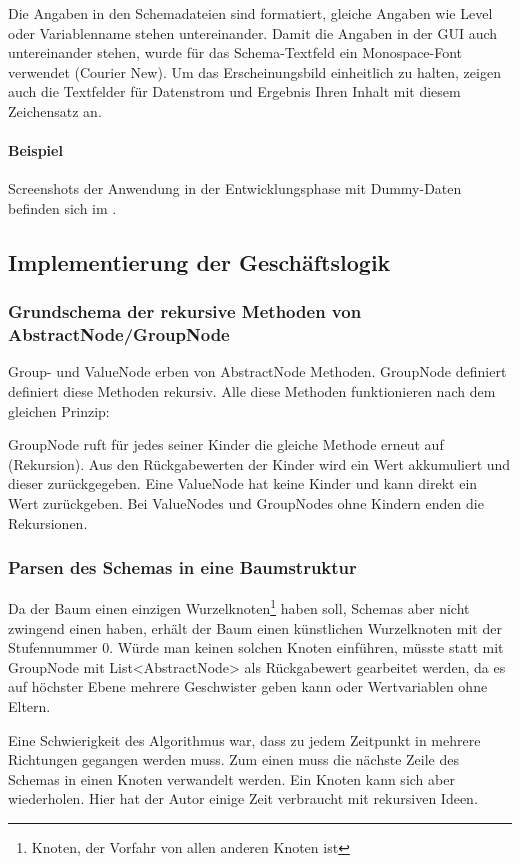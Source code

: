 Die Angaben in den Schemadateien sind formatiert, gleiche Angaben wie Level oder Variablenname stehen untereinander. Damit die Angaben in der GUI auch untereinander stehen, wurde für das Schema-Textfeld ein Monospace-Font verwendet (Courier New). Um das Erscheinungsbild einheitlich zu halten, zeigen auch die Textfelder für Datenstrom und Ergebnis Ihren Inhalt mit diesem Zeichensatz an.
\paragraph{Beispiel}
Screenshots der Anwendung in der Entwicklungsphase mit Dummy-Daten befinden sich im .


\subsection{Implementierung der Geschäftslogik}
\label{sec:ImplementierungGeschaeftslogik}

\subsubsection{Grundschema der rekursive Methoden von AbstractNode/GroupNode}
Group- und ValueNode erben von AbstractNode Methoden. GroupNode definiert definiert diese Methoden rekursiv. Alle diese Methoden funktionieren nach dem gleichen Prinzip:

GroupNode ruft für jedes seiner Kinder die gleiche Methode erneut auf (Rekursion). Aus den Rückgabewerten der Kinder wird ein Wert akkumuliert und dieser zurückgegeben.
Eine ValueNode hat keine Kinder und kann direkt ein Wert zurückgeben. Bei ValueNodes und GroupNodes ohne Kindern enden die Rekursionen.



\subsubsection{Parsen des Schemas in eine Baumstruktur}
Da der Baum einen einzigen Wurzelknoten\footnote{Knoten, der Vorfahr von allen anderen Knoten ist} haben soll, Schemas aber nicht zwingend einen haben, erhält der Baum einen künstlichen Wurzelknoten mit der Stufennummer 0. Würde man keinen solchen Knoten einführen, müsste statt mit GroupNode mit List<AbstractNode> als Rückgabewert gearbeitet werden, da es auf höchster Ebene mehrere Geschwister geben kann oder Wertvariablen ohne Eltern.

Eine Schwierigkeit des Algorithmus war, dass zu jedem Zeitpunkt in mehrere Richtungen gegangen werden muss. Zum einen muss die nächste Zeile des Schemas in einen Knoten verwandelt werden. Ein Knoten kann sich aber wiederholen.
Hier hat der Autor einige Zeit verbraucht mit rekursiven Ideen.

